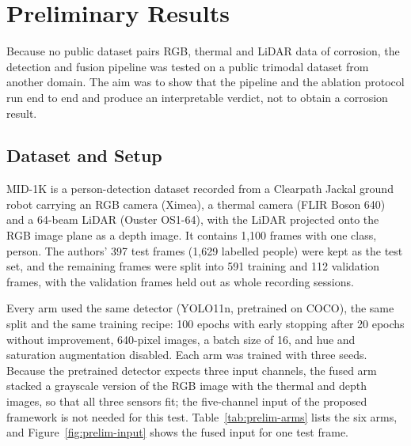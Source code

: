 \section{Preliminary Results}
\label{sec:preliminary-results}

Because no public dataset pairs RGB, thermal and LiDAR data of corrosion, the
detection and fusion pipeline was tested on a public trimodal dataset from
another domain. The aim was to show that the pipeline and the ablation protocol
run end to end and produce an interpretable verdict, not to obtain a corrosion
result.

\subsection{Dataset and Setup}

MID-1K \citep{Mota2024} is a person-detection dataset recorded from a Clearpath
Jackal ground robot carrying an RGB camera (Ximea), a thermal camera (FLIR Boson
640) and a 64-beam LiDAR (Ouster OS1-64), with the LiDAR projected onto the RGB
image plane as a depth image. It contains 1,100 frames with one class, person.
The authors' 397 test frames (1,629 labelled people) were kept as the test set,
and the remaining frames were split into 591 training and 112 validation frames,
with the validation frames held out as whole recording sessions.

Every arm used the same detector (YOLO11n, pretrained on COCO), the same split
and the same training recipe: 100 epochs with early stopping after 20 epochs
without improvement, 640-pixel images, a batch size of 16, and hue and
saturation augmentation disabled. Each arm was trained with three seeds. Because
the pretrained detector expects three input channels, the fused arm stacked a
grayscale version of the RGB image with the thermal and depth images, so that
all three sensors fit; the five-channel input of the proposed framework is not
needed for this test. Table~\ref{tab:prelim-arms} lists the six arms, and Figure~\ref{fig:prelim-input} shows the fused input
for one test frame.


